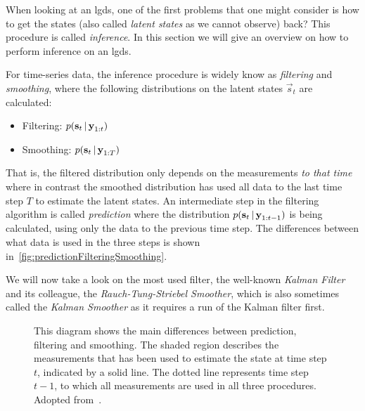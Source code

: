 	When looking at an \ac{lgds}, one of the first problems that one might consider is how to get the states (also called \emph{latent states} as we cannot observe) back? This procedure is called \emph{inference}. In this section we will give an overview on how to perform inference on an \ac{lgds}.

	For time-series data, the inference procedure is widely know as \emph{filtering} and \emph{smoothing}, where the following distributions on the latent states \( \vec{s}_t \) are calculated:
	\begin{itemize}
		\item Filtering: \tabto{2.5cm} \( p(\boldsymbol{\mathrm{s}}_t \,\vert\, \boldsymbol{\mathrm{y}}_{1:t}) \)
		\item Smoothing: \tabto{2.5cm} \( p(\boldsymbol{\mathrm{s}}_t \,\vert\, \boldsymbol{\mathrm{y}}_{1:T}) \)
	\end{itemize}
	That is, the filtered distribution only depends on the measurements \emph{to that time} where in contrast the smoothed distribution has used all data to the last time step \(T\) to estimate the latent states. An intermediate step in the filtering algorithm is called \emph{prediction} where the distribution \( p(\boldsymbol{\mathrm{s}}_t \,\vert\, \boldsymbol{\mathrm{y}}_{1:t - 1}) \) is being calculated, using only the data to the previous time step. The differences between what data is used in the three steps is shown in~\autoref{fig:predictionFilteringSmoothing}.

	We will now take a look on the most used filter, the well-known \emph{Kalman Filter} and its colleague, the \emph{Rauch-Tung-Striebel Smoother}, which is also sometimes called the \emph{Kalman Smoother} as it requires a run of the Kalman filter first.

	\begin{figure}
		\centering
		\tikzPredictionFilteringSmoothing
		\caption{This diagram shows the main differences between prediction, filtering and smoothing. The shaded region describes the measurements that has been used to estimate the state at time step \(t\), indicated by a solid line. The dotted line represents time step \(t - 1\), to which all measurements are used in all three procedures. \\ Adopted from~\cite{solinCubatureIntegrationMethods2010}.}
		\label{fig:predictionFilteringSmoothing}
	\end{figure}

